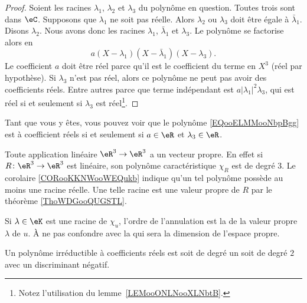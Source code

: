 \begin{proof}
    Soient les racines \( \lambda_1\), \( \lambda_2\) et \( \lambda_3\) du polynôme en question. Toutes trois sont dans \( \eC\). Supposons que \( \lambda_1\) ne soit pas réelle. Alors \( \lambda_2\) ou \( \lambda_3\) doit être égale à \( \bar\lambda_1\). Disons \( \lambda_2\). Nous avons donc les racines \( \lambda_1\), \( \bar\lambda_1\) et \( \lambda_3\). Le polynôme se factorise alors en
    \begin{equation}        \label{EQooELMMooNbpBgg}
        a(X-\lambda_1)(X-\bar\lambda_1)(X-\lambda_3).
    \end{equation}
    Le coefficient \( a\) doit être réel parce qu'il est le coefficient du terme en \( X^3\) (réel par hypothèse). Si \( \lambda_3\) n'est pas réel, alors ce polynôme ne peut pas avoir des coefficients réels. Entre autres parce que terme indépendant est \( a| \lambda_1 |^2\lambda_3\), qui est réel si et seulement si \( \lambda_3\) est réel\footnote{Notez l'utilisation du lemme~\ref{LEMooONLNooXLNbtB}.}.
\end{proof}
Tant que vous y êtes, vous pouvez voir que le polynôme \eqref{EQooELMMooNbpBgg} est à coefficient réels si et seulement si \( a\in \eR\) et \( \lambda_3\in \eR\).

\begin{example}     \label{EXooIPLOooSNfiWg}
    Toute application linéaire \( \eR^3\to \eR^3\) a un vecteur propre. En effet si \( R\colon \eR^3\to \eR^3\) est linéaire, son polynôme caractéristique \( \chi_R\) est de degré \( 3\). Le corolaire \ref{CORooKKNWooWEQukb} indique qu'un tel polynôme possède au moins une racine réelle.
    Une telle racine est une valeur propre de \( R\) par le théorème \ref{ThoWDGooQUGSTL}.
\end{example}

\begin{definition}
    Si \( \lambda\in\eK\) est une racine de \( \chi_u\), l'ordre de l'annulation est la  de la valeur propre \( \lambda\) de \( u\). À ne pas confondre avec la  qui sera la dimension de l'espace propre.
\end{definition}

\begin{proposition}
    Un polynôme irréductible à coefficients réels est soit de degré un soit de degré \( 2\) avec un discriminant négatif.
\end{proposition}

